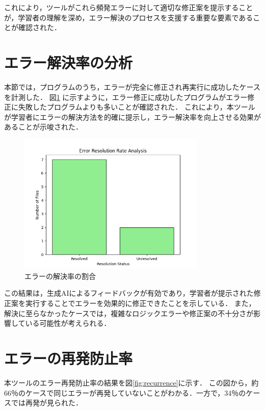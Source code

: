 \documentclass[12pt,twoside]{jbook}
\begin{document}
これにより，ツールがこれら頻発エラーに対して適切な修正案を提示することが，学習者の理解を深め，エラー解決のプロセスを支援する重要な要素であることが確認された．


\section{エラー解決率の分析}
本節では，プログラムのうち，エラーが完全に修正され再実行に成功したケースを計測した．
図\ref{fig:resolution} に示すように，エラー修正に成功したプログラムがエラー修正に失敗したプログラムよりも多いことが確認された．
これにより，本ツールが学習者にエラーの解決方法を的確に提示し，エラー解決率を向上させる効果があることが示唆された．

\begin{figure}[h]
  \centering
  \includegraphics[width=0.8\textwidth]{images/resolution_analysis.png}
  \caption{エラーの解決率の割合}
  \label{fig:resolution}
\end{figure}

この結果は，生成AIによるフィードバックが有効であり，学習者が提示された修正案を実行することでエラーを効果的に修正できたことを示している．
また，解決に至らなかったケースでは，複雑なロジックエラーや修正案の不十分さが影響している可能性が考えられる．


\section{エラーの再発防止率}
本ツールのエラー再発防止率の結果を図\ref{fig:recurrence}に示す．
この図から，約66％のケースで同じエラーが再発していないことがわかる．一方で，34％のケースでは再発が見られた．
\end{document}
